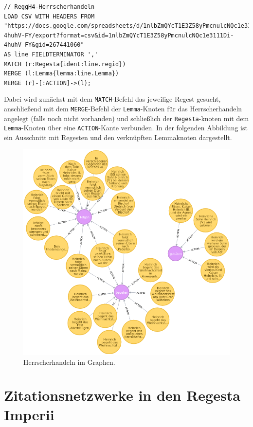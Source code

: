 \documentclass[ngerman,]{scrreprt}
\begin{document}
\begin{verbatim}
// ReggH4-Herrscherhandeln
LOAD CSV WITH HEADERS FROM "https://docs.google.com/spreadsheets/d/1nlbZmQYcT1E3Z58yPmcnulcNQc1e3111Di-4huhV-FY/export?format=csv&id=1nlbZmQYcT1E3Z58yPmcnulcNQc1e3111Di-4huhV-FY&gid=267441060"
AS line FIELDTERMINATOR ','
MATCH (r:Regesta{ident:line.regid})
MERGE (l:Lemma{lemma:line.Lemma})
MERGE (r)-[:ACTION]->(l);
\end{verbatim}

Dabei wird zunächst mit dem \texttt{MATCH}-Befehl das jeweilige Regest gesucht, anschließend mit dem \texttt{MERGE}-Befehl der \texttt{Lemma}-Knoten für das Herrscherhandeln angelegt (falls noch nicht vorhanden) und schließlich der \texttt{Regesta}-knoten mit dem \texttt{Lemma}-Knoten über eine \texttt{ACTION}-Kante verbunden. In der folgenden Abbildung ist ein Ausschnitt mit Regesten und den verknüpften Lemmaknoten dargestellt.

\begin{figure}
\centering
\includegraphics{Bilder/RI2Graph/ReggH4-Action.png}
\caption{Herrscherhandeln im Graphen.}
\end{figure}

\section{Zitationsnetzwerke in den Regesta Imperii}\label{zitationsnetzwerke-in-den-regesta-imperii}
\end{document}
